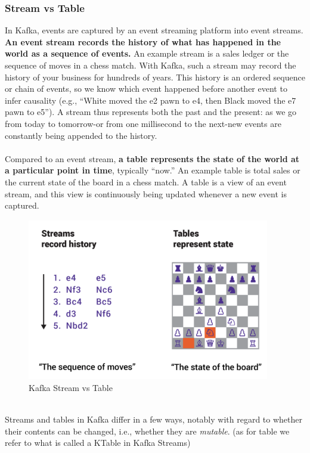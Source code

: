 \documentclass[10pt,a4paper]{article}
\newcommand{\nline}{\\~\\}
\begin{document}
\subsubsection{Stream vs Table}
In Kafka, events are captured by an event streaming platform into event streams. \textbf{An event stream records the history of what has happened in the world as a sequence of events.} An example stream is a sales ledger or the sequence of moves in a chess match. With Kafka, such a stream may record the history of your business for hundreds of years. This history is an ordered sequence or chain of events, so we know which event happened before another event to infer causality (e.g., “White moved the e2 pawn to e4, then Black moved the e7 pawn to e5”). A stream thus represents both the past and the present: as we go from today to tomorrow-or from one millisecond to the next-new events are constantly being appended to the history.
\nline
Compared to an event stream, \textbf{a table represents the state of the world at a particular point in time}, typically “now.” An example table is total sales or the current state of the board in a chess match. A table is a view of an event stream, and this view is continuously being updated whenever a new event is captured.
\begin{figure}[ht!]
 \hfill \includegraphics[width=300pt]{images/kafka-streams}\hspace*{\fill}
 \caption{Kafka Stream vs Table}
\end{figure}  \\
Streams and tables in Kafka differ in a few ways, notably with regard to whether their contents can be changed, i.e., whether they are \textit{mutable}. (as for table we refer to what is called a KTable in Kafka Streams)
\end{document}
